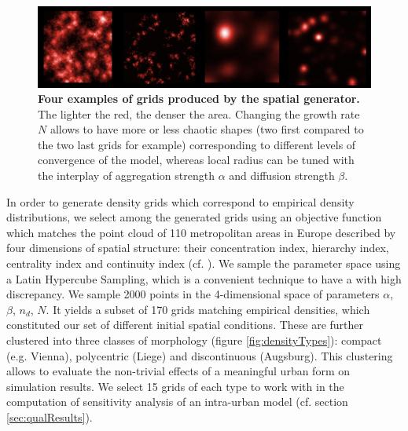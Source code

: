 \documentclass[preprint,5p,times,twocolumn,authoryear]{elsarticle}
\begin{document}
\begin{figure}[htbp] \begin{center} 
	\includegraphics[width=\linewidth]{figures/spatialGen.png}
 \caption{\textbf{Four examples of grids produced by the spatial generator.} The lighter the red, the denser the area. Changing the growth rate $N$ allows to have more or less chaotic shapes (two first compared to the two last grids for example) corresponding to different levels of convergence of the model, whereas local radius can be tuned with the interplay of aggregation strength $\alpha$ and diffusion strength $\beta$. }
\label{fig:spatialGen}
\end{center}
\end{figure} %



In order to generate density grids which correspond to empirical density distributions, we select among the generated grids using an objective function which matches the point cloud of 110 metropolitan areas in Europe described by four dimensions of spatial structure: their concentration index, hierarchy index, centrality index and continuity index (cf. \cite{LeNechet2015}). We sample the  parameter space using a Latin Hypercube Sampling, which is a convenient technique to have a  with high discrepancy. We sample 2000 points in the 4-dimensional space of parameters {$\alpha$, $\beta$, $n_d$, $N$}. It yields a subset of 170  grids matching empirical densities, which constituted our set of different initial spatial conditions. These are further clustered into three classes of morphology (figure \ref{fig:densityTypes}): compact (e.g. Vienna), polycentric (Liege) and discontinuous (Augsburg). This clustering allows to evaluate the non-trivial effects of a meaningful urban form on simulation results. We select 15 grids of each type to work with in the computation of sensitivity analysis of an intra-urban model (cf. section \ref{sec:qualResults}).
\end{document}
